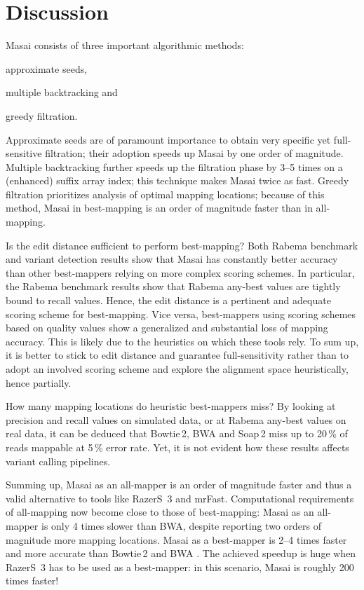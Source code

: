 \section{Discussion}

Masai consists of three important algorithmic methods: \begin{inparaenum}[(i)]
\item approximate seeds,
\item multiple backtracking and
\item greedy filtration.
\end{inparaenum}
Approximate seeds are of paramount importance to obtain very specific yet full-sensitive filtration; their adoption speeds up Masai by one order of magnitude.
Multiple backtracking further speeds up the filtration phase by 3--5 times on a (enhanced) suffix array index; this technique makes Masai twice as fast.
Greedy filtration prioritizes analysis of optimal mapping locations; because of this method, Masai in best-mapping is an order of magnitude faster than in all-mapping.

Is the edit distance sufficient to perform best-mapping?
Both Rabema benchmark and variant detection results show that Masai has constantly better accuracy than other best-mappers relying on more complex scoring schemes.
In particular, the Rabema benchmark results show that Rabema any-best values are tightly bound to recall values.
Hence, the edit distance is a pertinent and adequate scoring scheme for best-mapping.
Vice versa, best-mappers using scoring schemes based on quality values show a generalized and substantial loss of mapping accuracy.
This is likely due to the heuristics on which these tools rely.
To sum up, it is better to stick to edit distance and guarantee full-sensitivity rather than to adopt an involved scoring scheme and explore the alignment space heuristically, hence partially.

How many mapping locations do heuristic best-mappers miss?
By looking at precision and recall values on simulated data, or at Rabema any-best values on real data, it can be deduced that Bowtie\,2, BWA and Soap\,2 miss up to 20\,\% of reads mappable at 5\,\% error rate.
Yet, it is not evident how these results affects variant calling pipelines.

Summing up, Masai as an all-mapper is an order of magnitude faster and thus a valid alternative to tools like RazerS~3 and mrFast.
Computational requirements of all-mapping now become close to those of best-mapping: Masai as an all-mapper is only 4 times slower than BWA, despite reporting two orders of magnitude more mapping locations.
Masai as a best-mapper is 2--4 times faster and more accurate than Bowtie\,2 \citep{Bowtie2} and BWA \citep{BWA}.
The achieved speedup is huge when RazerS~3 has to be used as a best-mapper: in this scenario, Masai is roughly 200 times faster!

